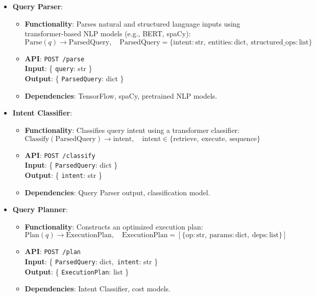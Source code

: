 \documentclass[11pt]{article}
\begin{document}
\begin{itemize}
    \item \textbf{Query Parser}:
        \begin{itemize}
            \item \textbf{Functionality}: Parses natural and structured language inputs using transformer-based NLP models (e.g., BERT, spaCy):
                \[
                \text{Parse}(q) \rightarrow \text{ParsedQuery}, \quad \text{ParsedQuery} = \{ \text{intent}: \text{str},\ \text{entities}: \text{dict},\ \text{structured\_ops}: \text{list} \}
                \]
            \item \textbf{API}: \texttt{POST /parse} \\
            \textbf{Input}: \{ \texttt{query}: str \} \\
            \textbf{Output}: \{ \texttt{ParsedQuery}: dict \}
            \item \textbf{Dependencies}: TensorFlow, spaCy, pretrained NLP models.
        \end{itemize}

    \item \textbf{Intent Classifier}:
        \begin{itemize}
            \item \textbf{Functionality}: Classifies query intent using a transformer classifier:
                \[
                \text{Classify}(\text{ParsedQuery}) \rightarrow \text{intent}, \quad \text{intent} \in \{ \text{retrieve},\ \text{execute},\ \text{sequence} \}
                \]
            \item \textbf{API}: \texttt{POST /classify} \\
            \textbf{Input}: \{ \texttt{ParsedQuery}: dict \} \\
            \textbf{Output}: \{ \texttt{intent}: str \}
            \item \textbf{Dependencies}: Query Parser output, classification model.
        \end{itemize}

    \item \textbf{Query Planner}:
        \begin{itemize}
            \item \textbf{Functionality}: Constructs an optimized execution plan:
                \[
                \text{Plan}(q) \rightarrow \text{ExecutionPlan}, \quad \text{ExecutionPlan} = [ \{ \text{op}: \text{str},\ \text{params}: \text{dict},\ \text{deps}: \text{list} \} ]
                \]
            \item \textbf{API}: \texttt{POST /plan} \\
            \textbf{Input}: \{ \texttt{ParsedQuery}: dict,\ \texttt{intent}: str \} \\
            \textbf{Output}: \{ \texttt{ExecutionPlan}: list \}
            \item \textbf{Dependencies}: Intent Classifier, cost models.
        \end{itemize}


\end{itemize}
\end{document}
